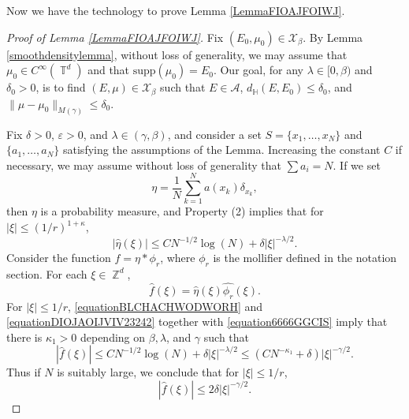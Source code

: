 \documentclass[dvipsnames,letterpaper,12pt]{article}
\numberwithin{equation}{section}
\DeclareMathOperator{\ZZ}{\mathbb{Z}}
\DeclareMathOperator{\TT}{\mathbb{T}}
\numberwithin{theorem}{section}
\begin{document}
Now we have the technology to prove Lemma \ref{LemmaFIOAJFOIWJ}.

\begin{proof}[Proof of Lemma \ref{LemmaFIOAJFOIWJ}]
    Fix $(E_0,\mu_0) \in \mathcal{X}_\beta$. By Lemma \ref{smoothdensitylemma}, without loss of generality, we may assume that $\mu_0 \in C^\infty(\TT^d)$ and that $\text{supp}(\mu_0) = E_0$. Our goal, for any $\lambda \in [0,\beta)$ and $\delta_0 > 0$, is to find $(E,\mu) \in \mathcal{X}_\beta$ such that $E \in \mathcal{A}$, $d_{\mathbb{H}}(E,E_0) \leq \delta_0$, and $\| \mu - \mu_0 \|_{M(\gamma)} \leq \delta_0$.

    Fix $\delta > 0$, $\varepsilon > 0$, and $\lambda \in (\gamma,\beta)$, and consider a set $S = \{ x_1, \dots, x_N \}$ and $\{ a_1, \dots, a_N \}$ satisfying the assumptions of the Lemma. Increasing the constant $C$ if necessary, we may assume without loss of generality that $\sum a_i = N$. If we set
    \[ \eta = \frac{1}{N} \sum_{k = 1}^N a(x_k) \delta_{x_k}, \]
    then $\eta$ is a probability measure, and Property (2) implies that for $|\xi| \leq (1/r)^{1 + \kappa}$,
    \begin{equation} \label{equationBLCHACHWODWORH}
        |\widehat{\eta}(\xi)| \leq C N^{-1/2} \log(N) + \delta |\xi|^{-\lambda/2}.
    \end{equation}
    Consider the function $f = \eta * \phi_r$, where $\phi_r$ is the mollifier defined in the notation section. For each $\xi \in \ZZ^d$,
    \begin{equation} \label{equation6666GGCIS}
        \widehat{f}(\xi) = \widehat{\eta}(\xi) \widehat{\phi_r}(\xi).
    \end{equation}
    For $|\xi| \leq 1/r$, \eqref{equationBLCHACHWODWORH} and \eqref{equationDIOJAOIJVIV23242} together with \eqref{equation6666GGCIS} imply that there is $\kappa_1 > 0$ depending on $\beta,\lambda$, and $\gamma$ such that
    \begin{equation}
        |\widehat{f}(\xi)| \leq C N^{-1/2} \log(N) + \delta |\xi|^{-\lambda/2} \leq (C N^{-\kappa_1} + \delta) |\xi|^{-\gamma/2}.
    \end{equation}
    Thus if $N$ is suitably large, we conclude that for $|\xi| \leq 1/r$,
    \begin{equation} \label{equationOIJVIOJOIJ21314}
        |\widehat{f}(\xi)| \leq 2 \delta |\xi|^{-\gamma/2}.
    \end{equation}

\end{proof}
\end{document}
